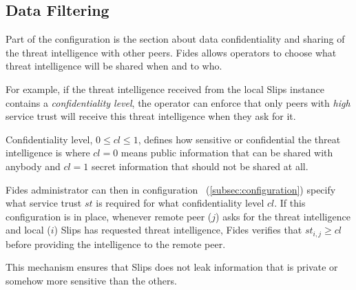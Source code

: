 \subsection{Data Filtering}
\label{subsec:data-filtering}
Part of the configuration is the section about data confidentiality and sharing of the threat intelligence with other peers.
Fides allows operators to choose what threat intelligence will be shared when and to who.

For example, if the threat intelligence received from the local Slips instance contains a  \textit{confidentiality level}, the operator can enforce that only peers with \textit{high} service trust will receive this threat intelligence when they ask for it.

Confidentiality level, $0 \leq cl \leq 1$, defines how sensitive or confidential the threat intelligence is where $cl = 0$ means public information that can be shared with anybody and $cl = 1$ secret information that should not be shared at all.

Fides administrator can then in configuration ~(\ref{subsec:configuration}) specify what service trust $st$ is required for what confidentiality level $cl$.
If this configuration is in place, whenever remote peer ($j$) asks for the threat intelligence and local ($i$) Slips has requested threat intelligence, Fides verifies that $st_{i, j} \geq cl$ before providing the intelligence to the remote peer.

This mechanism ensures that Slips does not leak information that is private or somehow more sensitive than the others.